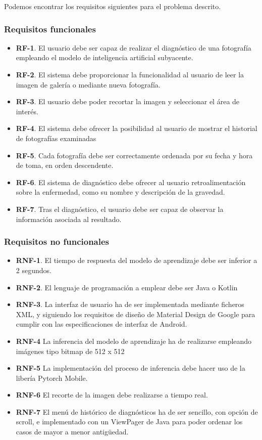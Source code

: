 Podemos encontrar los requisitos siguientes para el problema descrito.

\subsubsection{Requisitos funcionales}

\begin{itemize}
	\item \textbf{RF-1}. El usuario debe ser capaz de realizar el diagnóstico de una fotografía empleando el modelo de inteligencia artificial subyacente.
	\item \textbf{RF-2}. El sistema debe proporcionar la funcionalidad al usuario de leer la imagen de galería o mediante nueva fotografía.
	\item \textbf{RF-3}. El usuario debe poder recortar la imagen y seleccionar el área de interés.
	\item \textbf{RF-4}. El sistema debe ofrecer la posibilidad al usuario de mostrar el historial de fotografías examinadas
	\item\textbf{RF-5}. Cada fotografía debe ser correctamente ordenada por su fecha y hora de toma, en orden descendente.
	\item \textbf{RF-6}. El sistema de diagnóstico debe ofrecer al usuario retroalimentación sobre la enfermedad, como su nombre y descripción de la gravedad.
	\item \textbf{RF-7}. Tras el diagnóstico, el usuario debe ser capaz de observar la información asociada al resultado.
\end{itemize}

\subsubsection{Requisitos no funcionales}
	\begin{itemize}
		\item \textbf{RNF-1}. El tiempo de respuesta del modelo de aprendizaje debe ser inferior a 2 segundos.
		\item \textbf{RNF-2}. El lenguaje de programación a emplear debe ser Java o Kotlin
		\item \textbf{RNF-3}. La interfaz de usuario ha de ser implementada mediante ficheros XML, y siguiendo los requisitos de diseño de Material Design de Google para cumplir con las especificaciones de interfaz de Android.
		\item \textbf{RNF-4} La inferencia del modelo de aprendizaje ha de realizarse empleando imágenes tipo bitmap de 512 x 512
		\item \textbf{RNF-5} La implementación del proceso de inferencia debe hacer uso de la libería Pytorch Mobile.
		\item \textbf{RNF-6} El recorte de la imagen debe realizarse a tiempo real.
		\item \textbf{RNF-7} El menú de histórico de diagnósticos ha de ser sencillo, con opción de scroll, e implementado con un ViewPager de Java para poder ordenar los casos de mayor a menor antigüedad.
	\end{itemize}
